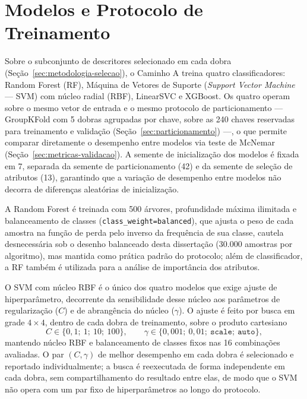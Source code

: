 \section{Modelos e Protocolo de Treinamento}
\label{sec:modelos-protocolo}

Sobre o subconjunto de descritores selecionado em cada dobra (Seção~\ref{sec:metodologia-selecao}), o Caminho A treina quatro classificadores: Random Forest (RF), Máquina de Vetores de Suporte (\emph{Support Vector Machine} --- SVM) com núcleo radial (RBF), LinearSVC e XGBoost. Os quatro operam sobre o mesmo vetor de entrada e o mesmo protocolo de particionamento --- GroupKFold com 5 dobras agrupadas por chave, sobre as 240 chaves reservadas para treinamento e validação (Seção~\ref{sec:particionamento}) ---, o que permite comparar diretamente o desempenho entre modelos via teste de McNemar (Seção~\ref{sec:metricas-validacao}). A semente de inicialização dos modelos é fixada em 7, separada da semente de particionamento (42) e da semente de seleção de atributos (13), garantindo que a variação de desempenho entre modelos não decorra de diferenças aleatórias de inicialização.

A Random Forest é treinada com 500 árvores, profundidade máxima ilimitada e balanceamento de classes (\texttt{class\_weight=balanced}), que ajusta o peso de cada amostra na função de perda pelo inverso da frequência de sua classe, cautela desnecessária sob o desenho balanceado desta dissertação (30.000 amostras por algoritmo), mas mantida como prática padrão do protocolo; além de classificador, a RF também é utilizada para a análise de importância dos atributos.

O SVM com núcleo RBF é o único dos quatro modelos que exige ajuste de hiperparâmetro, decorrente da sensibilidade desse núcleo aos parâmetros de regularização ($C$) e de abrangência do núcleo ($\gamma$). O ajuste é feito por busca em grade $4\times4$, dentro de cada dobra de treinamento, sobre o produto cartesiano
\begin{equation}
C \in \{0{,}1;\ 1;\ 10;\ 100\}, \qquad \gamma \in \{0{,}001;\ 0{,}01;\ \texttt{scale};\ \texttt{auto}\},
\end{equation}
mantendo núcleo RBF e balanceamento de classes fixos nas 16 combinações avaliadas. O par $(C,\gamma)$ de melhor desempenho em cada dobra é selecionado e reportado individualmente; a busca é reexecutada de forma independente em cada dobra, sem compartilhamento do resultado entre elas, de modo que o SVM não opera com um par fixo de hiperparâmetros ao longo do protocolo.

